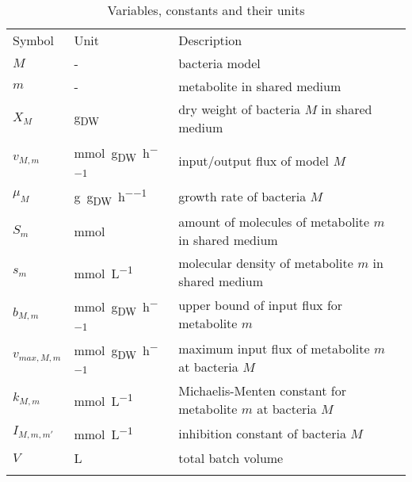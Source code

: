 \section{}
\begin{table}[]
\centering
\caption{Variables, constants and their units}
\label{tab:units_of_variables_and_constants}
\begin{tabular}{lll}
\rowcolor[HTML]{EFEFEF} 
Symbol                 & Unit    & Description\\
$M$                    & -       & bacteria model\\
$m$                    & -       & metabolite in shared medium\\
$X_M$                  & \si{\gram_{DW}} & dry weight of bacteria $M$ in shared medium\\
$v_{M,m}$              & \si{\milli\mole\per\gram_{DW}\per\hour} & input/output flux of model $M$\\
$\mu_M$                & \si{\gram\per\gram_{DW}\per\hour} & growth rate of bacteria $M$\\
$S_m$                  & \si{\milli\mole} & amount of molecules of metabolite $m$ in shared medium\\
$s_m$                  & \si{\milli\mole\per\liter} & molecular density of metabolite $m$ in shared medium\\
$b_{M,m}$              & \si{\milli\mole\per\gram_{DW}\per\hour} & upper bound of input flux for metabolite $m$\\
$v_{max,M,m}$          & \si{\milli\mole\per\gram_{DW}\per\hour} & maximum input flux of metabolite $m$ at bacteria $M$\\
$k_{M,m}$              & \si{\milli\mole\per\liter} & Michaelis-Menten constant for metabolite $m$ at bacteria $M$\\
$I_{M,m,m'}$           & \si{\milli\mole\per\liter} & inhibition constant of bacteria $M$\\
$V$                    & \si{\liter} & total batch volume\\
 &&\\

\end{tabular}
\end{table}

